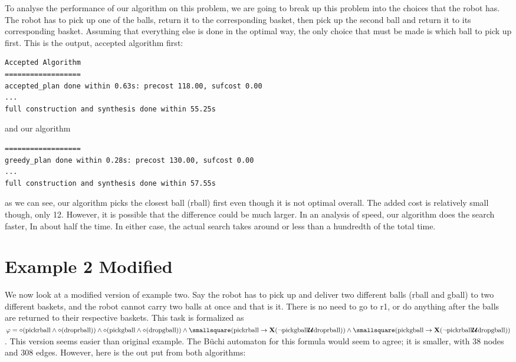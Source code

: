 To analyse the performance of our algorithm on this problem, we are going to break up this problem into the choices that the robot has. The robot has to pick up one of the balls, return it to the corresponding basket, then pick up the second ball and return it to its corresponding basket. Assuming that everything else is done in the optimal way, the only choice that must be made is which ball to pick up first. This is the output, accepted algorithm first:

\begingroup
\fontsize{9pt}{12pt}\selectfont
\begin{lstlisting}
Accepted Algorithm
==================
accepted_plan done within 0.63s: precost 118.00, sufcost 0.00
...
full construction and synthesis done within 55.25s 
\end{lstlisting}
\endgroup
and our algorithm
\begingroup
\fontsize{9pt}{12pt}\selectfont
\begin{lstlisting}
==================
greedy_plan done within 0.28s: precost 130.00, sufcost 0.00
...
full construction and synthesis done within 57.55s 
\end{lstlisting}
\endgroup
as we can see, our algorithm picks the closest ball (rball) first even though it is not optimal overall. The added cost is relatively small though, only 12. However, it is possible that the difference could be much larger. In an analysis of speed, our algorithm does the search faster, In about half the time. In either case, the actual search takes around or less than a hundredth of the total time.

\section{Example 2 Modified}
We now look at a modified version of example two. Say the robot has to pick up and deliver two different balls (rball and gball) to two different baskets, and the robot cannot carry two balls at once and that is it. There is no need to go to r1, or do anything after the balls are returned to their respective baskets. This task is formalized as $\varphi = \diamond (\text{pickrball} \wedge \diamond (\text{droprball})) \wedge \diamond(\text{pickgball} \wedge \diamond (\text{dropgball})) \wedge \smallsquare (\text{pickrball} \rightarrow \textbf{X}(\neg \text{pickgball} \U \text{droprball})) \wedge \smallsquare (\text{pickgball} \rightarrow \\ \textbf{X} (\neg \text{pickrball} \U \text{dropgball}))$. This version seems easier than original example. The B\"uchi automaton for this formula would seem to agree; it is smaller, with 38 nodes and 308 edges. However, here is the out put from both algorithms:

